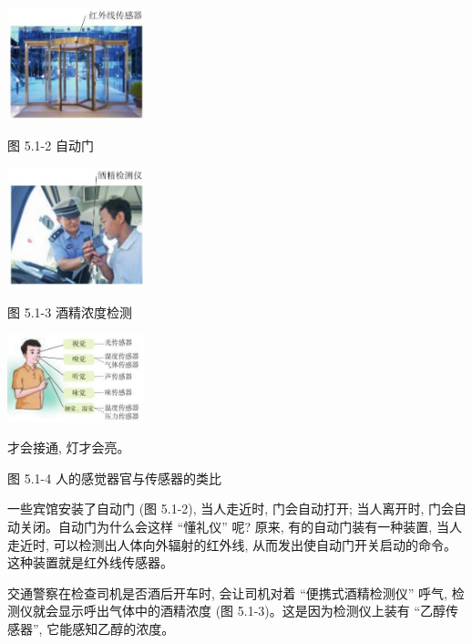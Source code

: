 \documentclass[10pt]{article}
\begin{document}
\begin{mdframed}

\begin{center}
\includegraphics[max width=0.3\textwidth]{images/01910e72-c5b7-7ed5-a6d4-fb3a5faefc32_97_148008.jpg}
\end{center}

图 5.1-2 自动门

\begin{center}
\includegraphics[max width=0.3\textwidth]{images/01910e72-c5b7-7ed5-a6d4-fb3a5faefc32_97_324464.jpg}
\end{center}

图 5.1-3 酒精浓度检测

\begin{center}
\includegraphics[max width=0.3\textwidth]{images/01910e72-c5b7-7ed5-a6d4-fb3a5faefc32_97_793484.jpg}
\end{center}

才会接通, 灯才会亮。

图 5.1-4 人的感觉器官与传感器的类比

\end{mdframed}

一些宾馆安装了自动门 (图 5.1-2), 当人走近时, 门会自动打开; 当人离开时, 门会自动关闭。自动门为什么会这样 “懂礼仪” 呢? 原来, 有的自动门装有一种装置, 当人走近时, 可以检测出人体向外辐射的红外线, 从而发出使自动门开关启动的命令。这种装置就是红外线传感器。

交通警察在检查司机是否酒后开车时, 会让司机对着 “便携式酒精检测仪” 呼气, 检测仪就会显示呼出气体中的酒精浓度 (图 5.1-3)。这是因为检测仪上装有 “乙醇传感器”, 它能感知乙醇的浓度。
\end{document}
